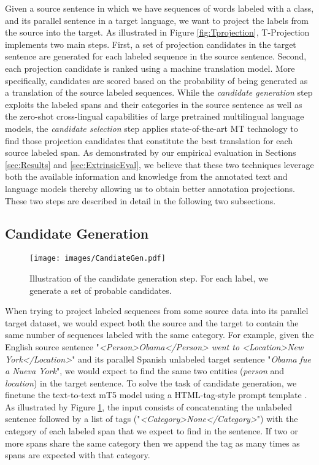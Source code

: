 \documentclass[11pt]{article}
\begin{document}
Given a source sentence in which we have sequences of words labeled with a class, and its parallel sentence in a target language, we want to project the labels from the source into the target. As illustrated in Figure \ref{fig:Tprojection}, T-Projection implements two main steps. First, a set of projection candidates in the target sentence are generated for each labeled sequence in the source sentence. Second, each projection candidate is ranked using a machine translation model. More specifically, candidates are scored based on the probability of being generated as a translation of the source labeled sequences. 
While the \emph{candidate generation} step exploits the labeled spans and their categories in the source sentence as well as the zero-shot cross-lingual capabilities of large pretrained multilingual language models, the \emph{candidate selection} step
applies state-of-the-art MT technology to find those 
projection candidates that constitute the best translation for each source labeled span. 
As demonstrated by our empirical evaluation in Sections \ref{sec:Results} and \ref{sec:ExtrinsicEval}, we
believe that these two techniques leverage both the available information and knowledge from the annotated text and language models thereby allowing us to obtain better annotation projections. These two steps are described in
detail in the following two subsections. 

\subsection{Candidate Generation}\label{sec:candidate-generation}

\begin{figure}[t]
\centering
\texttt{[image: images/CandiateGen.pdf]}
\caption{Illustration of the candidate generation step. For each label, we
generate a set of probable candidates.}
\label{fig:CandiateGen}
\end{figure}

When trying to project labeled sequences from some source data into its parallel target
dataset, we would expect both the source and the target to contain the same
number of sequences labeled with the same category. For example, given the English
source sentence "\textit{<Person>Obama</Person> went to <Location>New
York</Location>}" and its parallel Spanish unlabeled target sentence "\textit{Obama fue a Nueva
York}", we would expect to find the same two entities (\textit{person} and
\textit{location}) in the target sentence. To solve the task of candidate
generation, we finetune the text-to-text mT5
\cite{DBLP:conf/naacl/XueCRKASBR21} model using a HTML-tag-style prompt template
\cite{huang-etal-2022-multilingual-generative}. As illustrated by Figure
\ref{fig:CandiateGen}, the input consists of concatenating the unlabeled sentence 
followed by a list of tags ("\textit{<Category>None</Category>}") with the
category of each labeled span that we expect to find in the sentence. If
two or more spans share the same category then we append the tag as many times
as spans are expected with that category. 
\end{document}
